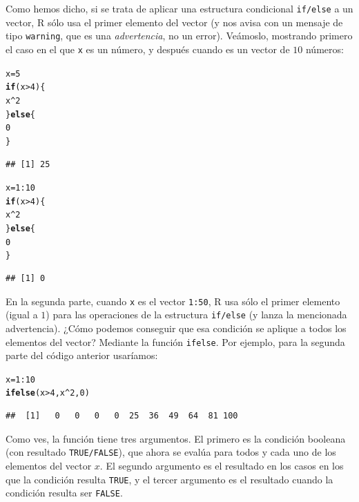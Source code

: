 \documentclass[10pt,a4paper]{article}\usepackage[]{graphicx}\usepackage[]{color}
\makeatletter
\newcommand{\hlnum}[1]{\textcolor[rgb]{0.686,0.059,0.569}{#1}}%
\newcommand{\hlopt}[1]{\textcolor[rgb]{0,0,0}{#1}}%
\newcommand{\hlstd}[1]{\textcolor[rgb]{0.345,0.345,0.345}{#1}}%
\newcommand{\hlkwa}[1]{\textcolor[rgb]{0.161,0.373,0.58}{\textbf{#1}}}%
\newcommand{\hlkwb}[1]{\textcolor[rgb]{0.69,0.353,0.396}{#1}}%
\newcommand{\hlkwd}[1]{\textcolor[rgb]{0.737,0.353,0.396}{\textbf{#1}}}%
\newenvironment{kframe}{%
 \def\at@end@of@kframe{}%
 \ifinner\ifhmode%
  \def\at@end@of@kframe{\end{minipage}}%
  \begin{minipage}{\columnwidth}%
 \fi\fi%
 \def\FrameCommand##1{\hskip\@totalleftmargin \hskip-\fboxsep
 \colorbox{shadecolor}{##1}\hskip-\fboxsep
     \hskip-\linewidth \hskip-\@totalleftmargin \hskip\columnwidth}%
 \MakeFramed {\advance\hsize-\width
   \@totalleftmargin\z@ \linewidth\hsize
   \@setminipage}}%
 {\par\unskip\endMakeFramed%
 \at@end@of@kframe}
\newenvironment{knitrout}{}{} %
\makeatother
\begin{document}
Como hemos dicho, si se trata de aplicar una estructura condicional {\tt if/else} a un vector, R sólo usa el primer elemento del vector (y nos avisa con un mensaje de tipo {\tt warning}, que es una {\em advertencia}, no un error). Veámoslo, mostrando primero el caso en el que {\tt x} es un número, y después cuando es un vector de $10$ números:
\begin{knitrout}
\color{fgcolor}\begin{kframe}
\begin{alltt}
\hlstd{x} \hlkwb{=} \hlnum{5}
\hlkwa{if}\hlstd{(x} \hlopt{>} \hlnum{4}\hlstd{)\{}
        \hlstd{x}\hlopt{^}\hlnum{2}
    \hlstd{\}} \hlkwa{else} \hlstd{\{}
        \hlnum{0}
    \hlstd{\}}
\end{alltt}
\begin{verbatim}
## [1] 25
\end{verbatim}
\begin{alltt}
\hlstd{x} \hlkwb{=} \hlnum{1}\hlopt{:}\hlnum{10}
\hlkwa{if}\hlstd{(x} \hlopt{>} \hlnum{4}\hlstd{)\{}
        \hlstd{x}\hlopt{^}\hlnum{2}
    \hlstd{\}} \hlkwa{else} \hlstd{\{}
        \hlnum{0}
    \hlstd{\}}
\end{alltt}


{\ttfamily\noindent{}}\begin{verbatim}
## [1] 0
\end{verbatim}
\end{kframe}
\end{knitrout}
En la segunda parte, cuando {\tt x} es el vector {\tt 1:50}, R usa sólo el primer elemento (igual a $1$) para las operaciones de la estructura {\tt if/else} (y lanza la mencionada advertencia). ¿Cómo podemos conseguir que esa condición se aplique a todos los elementos del vector? Mediante la función {\tt ifelse}. Por ejemplo, para la segunda parte del código anterior usaríamos:
\begin{knitrout}
\color{fgcolor}\begin{kframe}
\begin{alltt}
        \hlstd{x} \hlkwb{=} \hlnum{1}\hlopt{:}\hlnum{10}
        \hlkwd{ifelse}\hlstd{(x} \hlopt{>} \hlnum{4}\hlstd{, x}\hlopt{^}\hlnum{2}\hlstd{,} \hlnum{0}\hlstd{)}
\end{alltt}
\begin{verbatim}
##  [1]   0   0   0   0  25  36  49  64  81 100
\end{verbatim}
\end{kframe}
\end{knitrout}
Como ves, la función tiene tres argumentos. El primero es la condición booleana (con resultado {\tt TRUE/FALSE}), que ahora se evalúa para todos y cada uno de los elementos del vector $x$. El segundo argumento es el resultado en los casos en los que la condición resulta {\tt TRUE}, y el tercer argumento es el resultado cuando la condición resulta ser {\tt FALSE}.
\end{document}
